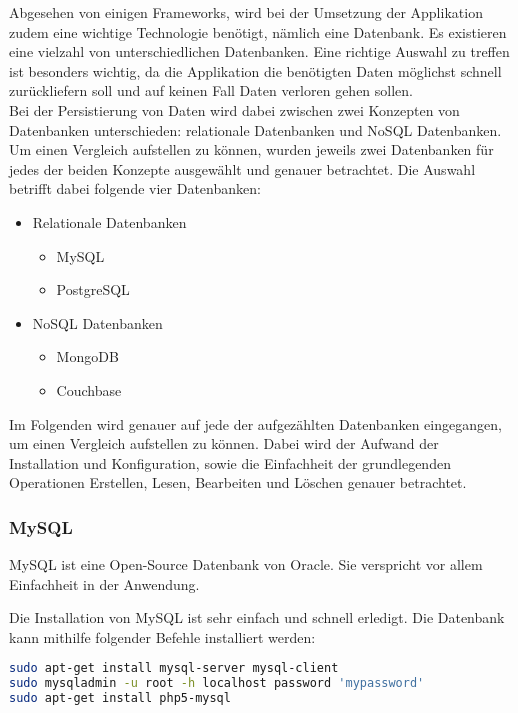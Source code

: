 
Abgesehen von einigen Frameworks, wird bei der Umsetzung der Applikation zudem eine wichtige Technologie benötigt, nämlich eine Datenbank. Es existieren eine vielzahl von unterschiedlichen Datenbanken. Eine richtige Auswahl zu treffen ist besonders wichtig, da die Applikation die benötigten Daten möglichst schnell zurückliefern soll und auf keinen Fall Daten verloren gehen sollen. \\
Bei der Persistierung von Daten wird dabei zwischen zwei Konzepten von Datenbanken unterschieden: relationale Datenbanken und NoSQL Datenbanken. Um einen Vergleich aufstellen zu können, wurden jeweils zwei Datenbanken für jedes der beiden Konzepte ausgewählt und genauer betrachtet. Die Auswahl betrifft dabei folgende vier Datenbanken:\\
\begin{itemize}
\item Relationale Datenbanken
\begin{itemize}
\item MySQL
\item PostgreSQL
\end{itemize}
\item NoSQL Datenbanken
\begin{itemize}
\item MongoDB
\item Couchbase
\end{itemize}
\end{itemize}

Im Folgenden wird genauer auf jede der aufgezählten Datenbanken eingegangen, um einen Vergleich aufstellen zu können. Dabei wird der Aufwand der Installation und Konfiguration, sowie die Einfachheit der grundlegenden Operationen Erstellen, Lesen, Bearbeiten und Löschen genauer betrachtet.

\subsubsection{MySQL}
MySQL ist eine Open-Source Datenbank von Oracle. Sie verspricht vor allem Einfachheit in der Anwendung.\cite{ABOUTMYSQL}

Die Installation von MySQL ist sehr einfach und schnell erledigt. Die Datenbank kann mithilfe folgender Befehle installiert werden:
\begin{lstlisting}[caption=Installation von MySQL \cite{MYSQLINSTALL}, language=bash]
sudo apt-get install mysql-server mysql-client
sudo mysqladmin -u root -h localhost password 'mypassword'
sudo apt-get install php5-mysql
\end{lstlisting}

